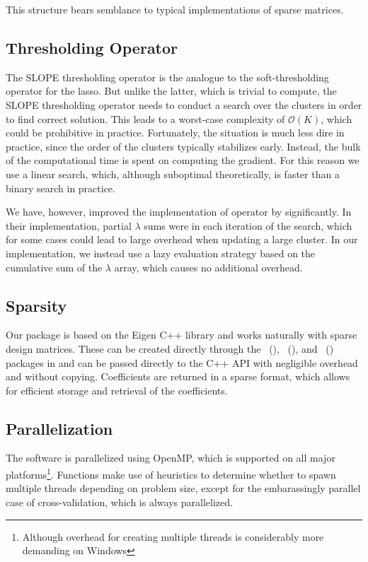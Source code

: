 \documentclass[article]{jss}
\begin{document}
This structure bears semblance to typical implementations of
sparse matrices.

\subsection{Thresholding Operator}

The SLOPE thresholding operator is the analogue to the
soft-thresholding operator for the lasso. But unlike the
latter, which is trivial to compute, the SLOPE thresholding operator
needs to conduct a search over the clusters in order to find correct
solution. This leads to a worst-case complexity of
\(\mathcal{O}(K)\), which could be prohibitive in practice.
Fortunately, the situation is much less dire in practice, since
the order of the clusters typically stabilizes early. Instead, the
bulk of the computational time is spent on computing the gradient.
For this reason we use a linear search, which, although suboptimal
theoretically, is faster than a binary search in practice.

We have, however, improved the implementation of
operator by \citet{larsson2023} significantly. In their implementation,
partial \(\lambda\) sums were in each iteration of the search, which
for some cases could lead to large overhead when updating
a large cluster. In our implementation, we instead use a lazy
evaluation strategy based on the cumulative sum of the \(\lambda\) array,
which causes no additional overhead.

\subsection{Sparsity}

Our package is based on the Eigen C++ library and works naturally with sparse
design matrices. These can be created directly through the
~(), ~(), and ~() packages in
and can be passed directly to the C++ API with negligible overhead
and without copying. Coefficients are returned in a sparse format, which
allows for efficient storage and retrieval of the coefficients.

\subsection{Parallelization}

The software is parallelized using OpenMP, which is supported
on all major platforms\footnote{Although overhead for creating
  multiple threads is considerably more demanding on Windows}.
Functions make use of heuristics to determine whether to
spawn multiple threads depending on problem size, except for
the embarassingly parallel case of cross-validation, which is always
parallelized.
\end{document}
